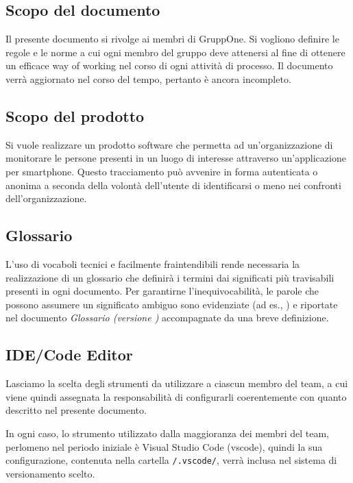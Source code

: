 \documentclass[../norme-di-progetto.tex]{subfiles}
\begin{document}
\subsection{Scopo del documento}%
\label{sub:scopo_del_documento}

Il presente documento si rivolge ai membri di GruppOne.
Si vogliono definire le regole e le norme a cui ogni membro del gruppo deve attenersi al fine di ottenere un efficace way of working nel corso di ogni attività di processo.
Il documento verrà aggiornato nel corso del tempo, pertanto è ancora incompleto.

\subsection{Scopo del prodotto}%
\label{sub:scopo_del_prodotto}

Si vuole realizzare un prodotto software che permetta ad un'organizzazione di monitorare le persone presenti in un luogo di interesse attraverso un'applicazione per smartphone.
Questo tracciamento può avvenire in forma autenticata o anonima a seconda della volontà dell'utente di identificarsi o meno nei confronti dell'organizzazione.

\subsection{Glossario}%
\label{sub:glossario}

L'uso di vocaboli tecnici e facilmente fraintendibili rende necessaria la realizzazione di un glossario che definirà i termini dai significati più travisabili presenti in ogni documento.
Per garantirne l'inequivocabilità, le parole che possono assumere un significato ambiguo sono evidenziate (ad es., ) e riportate nel documento \textit{Glossario (versione \versione)} accompagnate da una breve definizione.

\subsection{IDE/Code Editor}%
\label{sub:ide_code_editor}

Lasciamo la scelta degli strumenti da utilizzare a ciascun membro del team, a cui viene quindi assegnata la responsabilità di configurarli coerentemente con quanto descritto nel presente documento.

In ogni caso, lo strumento utilizzato dalla maggioranza dei membri del team, perlomeno nel periodo iniziale è Visual Studio Code (vscode), quindi la sua configurazione, contenuta nella cartella \verb|/.vscode/|, verrà inclusa nel sistema di versionamento scelto.
\end{document}
